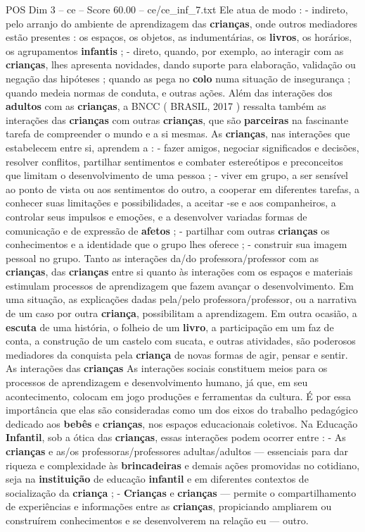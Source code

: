 \begin{textsample}{POS Dim 3 – ce – Score 60.00 – ce/ce\_inf\_7.txt}
Ele atua de modo : - indireto, pelo arranjo do ambiente de aprendizagem das \textbf{crianças}, onde outros mediadores estão presentes : os espaços, os objetos, as indumentárias, os \textbf{livros}, os horários, os agrupamentos \textbf{infantis} ; - direto, quando, por exemplo, ao interagir com as \textbf{crianças}, lhes apresenta novidades, dando suporte para elaboração, validação ou negação das hipóteses ; quando as pega no \textbf{colo} numa situação de insegurança ; quando medeia normas de conduta, e outras ações.
Além das interações dos \textbf{adultos} com as \textbf{crianças}, a BNCC ( BRASIL, 2017 ) ressalta também as interações das \textbf{crianças} com outras \textbf{crianças}, que são \textbf{parceiras} na fascinante tarefa de compreender o mundo e a si mesmas.
As \textbf{crianças}, nas interações que estabelecem entre si, aprendem a : - fazer amigos, negociar significados e decisões, resolver conflitos, partilhar sentimentos e combater estereótipos e preconceitos que limitam o desenvolvimento de uma pessoa ; - viver em grupo, a ser sensível ao ponto de vista ou aos sentimentos do outro, a cooperar em diferentes tarefas, a conhecer suas limitações e possibilidades, a aceitar -se e aos companheiros, a controlar seus impulsos e emoções, e a desenvolver variadas formas de comunicação e de expressão de \textbf{afetos} ; - partilhar com outras \textbf{crianças} os conhecimentos e a identidade que o grupo lhes oferece ; - construir sua imagem pessoal no grupo.
Tanto as interações da/do professora/professor com as \textbf{crianças}, das \textbf{crianças} entre si quanto às interações com os espaços e materiais estimulam processos de aprendizagem que fazem avançar o desenvolvimento.
Em uma situação, as explicações dadas pela/pelo professora/professor, ou a narrativa de um caso por outra \textbf{criança}, possibilitam a aprendizagem.
Em outra ocasião, a \textbf{escuta} de uma história, o folheio de um \textbf{livro}, a participação em um faz de conta, a construção de um castelo com sucata, e outras atividades, são poderosos mediadores da conquista pela \textbf{criança} de novas formas de agir, pensar e sentir.
As interações das \textbf{crianças} As interações sociais constituem meios para os processos de aprendizagem e desenvolvimento humano, já que, em seu acontecimento, colocam em jogo produções e ferramentas da cultura.
É por essa importância que elas são consideradas como um dos eixos do trabalho pedagógico dedicado aos \textbf{bebês} e \textbf{crianças}, nos espaços educacionais coletivos.
Na Educação \textbf{Infantil}, sob a ótica das \textbf{crianças}, essas interações podem ocorrer entre : - As \textbf{crianças} e as/os professoras/professores adultas/adultos — essenciais para dar riqueza e complexidade às \textbf{brincadeiras} e demais ações promovidas no cotidiano, seja na \textbf{instituição} de educação \textbf{infantil} e em diferentes contextos de socialização da \textbf{criança} ; - \textbf{Crianças} e \textbf{crianças} — permite o compartilhamento de experiências e informações entre as \textbf{crianças}, propiciando ampliarem ou construírem conhecimentos e se desenvolverem na relação eu — outro.

\end{textsample}
